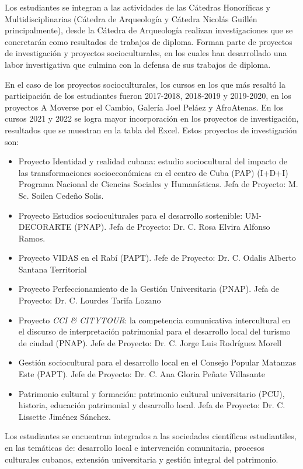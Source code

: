 Los estudiantes se integran a las actividades de las Cátedras Honoríficas y Multidisciplinarias (Cátedra de Arqueología y Cátedra Nicolás Guillén principalmente), desde la Cátedra de Arqueología realizan investigaciones que se concretarán como resultados de trabajos de diploma. Forman parte de proyectos de investigación y proyectos socioculturales, en los cuales han desarrollado una labor investigativa que culmina con la defensa de sus trabajos de diploma.

En el caso de los proyectos socioculturales, los cursos en los que más resaltó la participación de los estudiantes fueron 2017-2018, 2018-2019 y 2019-2020, en los proyectos A Moverse por el Cambio, Galería Joel Peláez y AfroAtenas. En los cursos 2021 y 2022 se logra mayor incorporación en los proyectos de investigación, resultados que se muestran en la tabla del Excel. Estos proyectos de investigación son: 

\begin{itemize}
	\item Proyecto Identidad y realidad cubana: estudio sociocultural del impacto de las transformaciones socioeconómicas en el centro de Cuba (PAP) (I+D+I) Programa Nacional de Ciencias Sociales y Humanísticas. Jefa de Proyecto: M. Sc. Soilen Cedeño Solis. 
	\item Proyecto Estudios socioculturales para el desarrollo sostenible: UM-DECORARTE (PNAP). Jefa de Proyecto: Dr. C. Rosa Elvira Alfonso Ramos.
	\item Proyecto VIDAS en el Rabí (PAPT). Jefe de Proyecto: Dr. C. Odalis Alberto Santana Territorial
	\item Proyecto Perfeccionamiento de la Gestión Universitaria (PNAP). Jefa de Proyecto: Dr. C. Lourdes Tarifa Lozano 
	\item Proyecto \emph{CCI \& CITYTOUR}:  la competencia comunicativa intercultural en el discurso de interpretación patrimonial para el desarrollo local del turismo de ciudad (PNAP). Jefe de Proyecto: Dr. C. Jorge Luis Rodríguez Morell 
	\item Gestión sociocultural para el desarrollo local en el Consejo Popular Matanzas Este (PAPT). Jefe de Proyecto: Dr. C. Ana Gloria Peñate Villasante
	\item Patrimonio cultural y formación: patrimonio cultural universitario (PCU), historia, educación patrimonial y desarrollo local. Jefa de Proyecto: Dr. C. Lissette Jiménez Sánchez.
\end{itemize}

Los estudiantes se encuentran integrados a las sociedades científicas estudiantiles, en las temáticas de: desarrollo local e intervención comunitaria, procesos culturales cubanos, extensión universitaria y gestión integral del patrimonio. 

